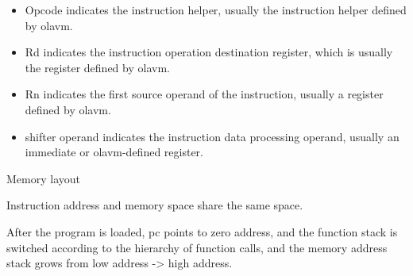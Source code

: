 \begin{itemize}
    \item Opcode indicates the instruction helper, usually the instruction helper defined by olavm.\par
    \item Rd indicates the instruction operation destination register, which is usually the register defined by olavm.\par
    \item Rn indicates the first source operand of the instruction, usually a register defined by olavm.\par
    \item shifter operand indicates the instruction data processing operand, usually an immediate or olavm-defined register.
\end{itemize}

Memory layout\par
Instruction address and memory space share the same space.

After the program is loaded, pc points to zero address, and the function stack is switched according to the hierarchy of function calls, 
and the memory address stack grows from low address -> high address.